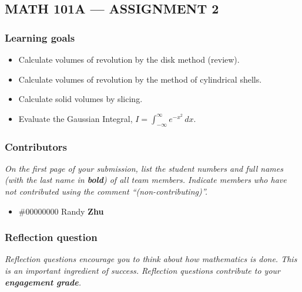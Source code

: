 \documentclass{exam}
\begin{document}
\subsection*{MATH 101A --- ASSIGNMENT 2}

\subsubsection*{Learning goals}
\begin{itemize}
    \setlength\itemsep{0.1em}
    \item Calculate volumes of revolution by the disk method (review).
    \item Calculate volumes of revolution by the method of cylindrical shells.
    \item Calculate solid volumes by slicing.
    \item Evaluate the Gaussian Integral, $\displaystyle I = \int_{-\infty}^{\infty} e^{-x^2}\,dx$.
\end{itemize}

\subsubsection*{Contributors}

\textit{On the first page of your submission, list the student numbers and full names (with the last name in \textbf{bold}) of all team members. Indicate members who have not contributed using the comment ``(non-contributing)''.}

\begin{itemize}
    \item \#00000000 Randy {\bf Zhu}
\end{itemize}

\subsubsection*{Reflection question}

\textit{Reflection questions encourage you to think about how mathematics is done. This is an important ingredient of success. Reflection questions contribute to your \textbf{engagement grade}.}
\end{document}
